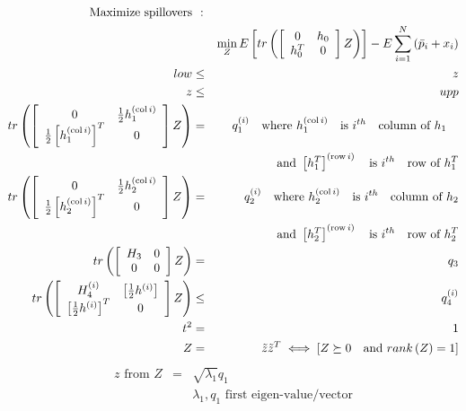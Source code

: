 \documentclass{article}
\begin{document}
\begin{eqnarray*}
\text{Maximize spillovers} &\text{:}& \\
&&\min_{Z}E\left[ tr\left( \left[ 
\begin{array}{cc}
0 & h_{0} \\ 
h_{0}^{T} & 0%
\end{array}%
\right] Z\right) \right] -E\sum_{i=1}^{N}\left( \bar{p}_{i}+x_{i}\right) \\
low &\leq &z \\
z &\leq &upp \\
tr\left( \left[ 
\begin{array}{cc}
0 & \frac{1}{2}h_{1}^{\left( \func{col}i\right) } \\ 
\frac{1}{2}\left[ h_{1}^{\left( \func{col}i\right) }\right] ^{T} & 0%
\end{array}%
\right] Z\right) &=&q_{1}^{\left( i\right) }\text{ where }h_{1}^{\left( 
\func{col}i\right) }\text{ is }i^{th}\text{ column of }h_{1}\text{ } \\
&&\text{and }\left[ h_{1}^{T}\right] ^{\left( \func{row}i\right) }\text{ is }%
i^{th}\text{ row of }h_{1}^{T} \\
tr\left( \left[ 
\begin{array}{cc}
0 & \frac{1}{2}h_{2}^{\left( \func{col}i\right) } \\ 
\frac{1}{2}\left[ h_{2}^{\left( \func{col}i\right) }\right] ^{T} & 0%
\end{array}%
\right] Z\right) &=&q_{2}^{\left( i\right) }\text{ where }h_{2}^{\left( 
\func{col}i\right) }\text{ is }i^{th}\text{ column of }h_{2} \\
&&\text{and }\left[ h_{2}^{T}\right] ^{\left( \func{row}i\right) }\text{ is }%
i^{th}\text{ row of }h_{2}^{T} \\
tr\left( \left[ 
\begin{array}{cc}
H_{3} & 0 \\ 
0 & 0%
\end{array}%
\right] Z\right) &=&q_{3} \\
tr\left( \left[ 
\begin{array}{cc}
H_{4}^{\left( i\right) } & \left[ \frac{1}{2}h^{\left( i\right) }\right] \\ 
\left[ \frac{1}{2}h^{\left( i\right) }\right] ^{T} & 0%
\end{array}%
\right] Z\right) &\leq &q_{4}^{\left( i\right) } \\
t^{2} &=&1 \\
Z &=&\tilde{z}\tilde{z}^{T}\iff \left[ Z\succeq 0\text{ and }rank\left(
Z\right) =1\right]
\end{eqnarray*}%
\begin{eqnarray*}
z\text{ from }Z &=&\sqrt{\lambda _{1}}q_{1} \\
&&\lambda _{1},q_{1}\text{ first eigen-value/vector}
\end{eqnarray*}
\end{document}
